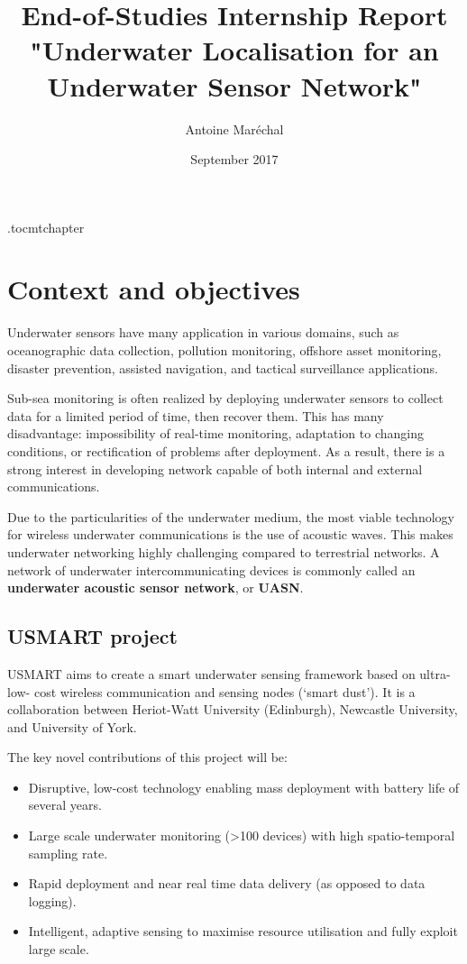 \documentclass[12pt,a4paper,fleqn]{report}
\title{%
	End-of-Studies Internship Report \\
	\large "Underwater Localisation for an Underwater Sensor Network" \\
}
\author{Antoine Maréchal}
\date{September 2017}
\begin{document}
\maketitle

\etocdepthtag.toc{mtchapter}
\setcounter{tocdepth}{1}
\tableofcontents

%

\chapter{Context and objectives}

Underwater sensors have many application in various domains, such as oceanographic
data collection, pollution monitoring, offshore asset monitoring, disaster prevention, assisted navigation, and tactical surveillance applications.

Sub-sea monitoring is often realized by deploying underwater sensors to collect data for a limited period of time, then recover them. This has many disadvantage: impossibility of real-time monitoring, adaptation to changing conditions, or rectification of problems after deployment. As a result, there is a strong interest in developing network capable of both internal and external communications.

Due to the particularities of the underwater medium, the most viable technology for wireless underwater communications is the use of acoustic waves. This makes underwater networking highly challenging compared to terrestrial networks. A network of underwater intercommunicating devices is commonly called an \textbf{underwater acoustic sensor network}, or \textbf{UASN}.

\section{USMART project}

USMART aims to create a smart underwater sensing framework based on ultra-low-
cost wireless communication and sensing nodes (‘smart dust’). It is a collaboration between Heriot-Watt University (Edinburgh), Newcastle University, and University of York.

The key novel contributions of this project will be:
\begin{itemize}
	\itemsep0em
	\item Disruptive, low-cost technology enabling mass deployment with battery life of several years.
	\item Large scale underwater monitoring (>100 devices) with high spatio-temporal sampling rate.
	\item Rapid deployment and near real time data delivery (as opposed to data logging).
	\item Intelligent, adaptive sensing to maximise resource utilisation and fully exploit large scale.
\end{itemize}
\end{document}
